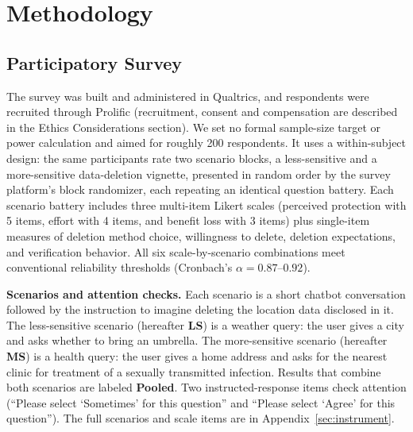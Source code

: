 \documentclass[conference,compsoc]{IEEEtran}
\begin{document}
\section{Methodology}
\label{sec:methodology}

\subsection{Participatory Survey}
\label{sec:survey-methodology}

The survey was built and administered in Qualtrics, and respondents were
recruited through Prolific (recruitment, consent and compensation are
described in the Ethics Considerations section). We set no formal sample-size
target or power calculation and aimed for roughly 200 respondents. It uses a within-subject design: the same participants rate two
scenario blocks, a less-sensitive and a more-sensitive data-deletion vignette,
presented in random order by the survey platform's block randomizer, each
repeating an identical question battery. Each scenario battery includes
three multi-item Likert scales (perceived protection with 5 items, effort
with 4 items, and benefit loss with 3 items) plus single-item measures of
deletion method choice, willingness to delete, deletion expectations, and
verification behavior. All six scale-by-scenario combinations meet
conventional reliability thresholds (Cronbach's $\alpha=0.87$--$0.92$).

\textbf{Scenarios and attention checks.} Each scenario is a short
chatbot conversation followed by the instruction to imagine deleting the
location data disclosed in it. The less-sensitive scenario (hereafter \textbf{LS}) is a weather
query: the user gives a city and asks whether to bring an umbrella. The
more-sensitive scenario (hereafter \textbf{MS}) is a health query: the user gives a home address
and asks for the nearest clinic for treatment of a sexually transmitted
infection. Results that combine both scenarios are labeled \textbf{Pooled}. Two instructed-response items check attention (``Please select
`Sometimes' for this question'' and ``Please select `Agree' for this
question''). The full scenarios and scale items are in Appendix~\ref{sec:instrument}.
\end{document}
